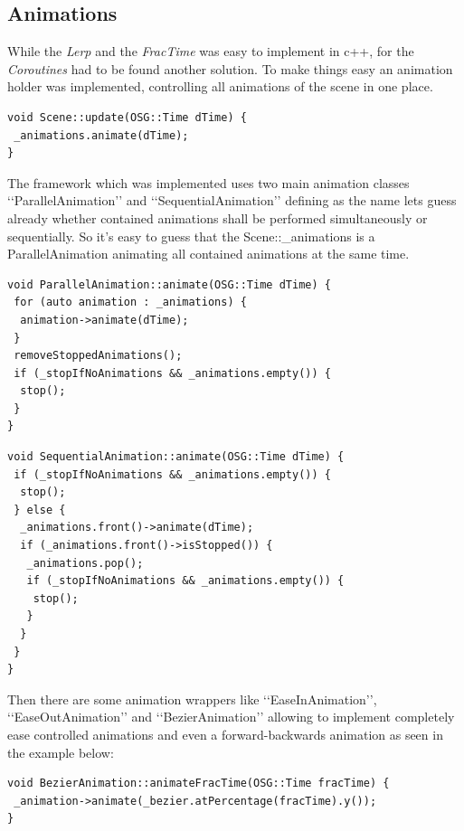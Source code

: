 \subsection{Animations}

While the \emph{Lerp} and the \emph{FracTime} was easy to implement in c++, for the \emph{Coroutines} had to be found another solution. To make things easy an animation holder was implemented, controlling all animations of the scene in one place.

\begin{lstlisting}[breaklines=true]
void Scene::update(OSG::Time dTime) {
 _animations.animate(dTime);
}
\end{lstlisting}

The framework which was implemented uses two main animation classes \lq\lq{}ParallelAnimation\rq\rq{} and \lq\lq{}SequentialAnimation\rq\rq{} defining as the name lets guess already whether contained animations shall be performed simultaneously or sequentially. So it\rq{}s easy to guess that the Scene::\_animations is a ParallelAnimation animating all contained animations at the same time.
\begin{lstlisting}[breaklines=true, caption={ParallelAnimation::animate}]
void ParallelAnimation::animate(OSG::Time dTime) {
 for (auto animation : _animations) {
  animation->animate(dTime);
 }
 removeStoppedAnimations();
 if (_stopIfNoAnimations && _animations.empty()) {
  stop();
 }
}
\end{lstlisting}

\begin{lstlisting}[breaklines=true, caption={SequentialAnimation::animate}]
void SequentialAnimation::animate(OSG::Time dTime) {
 if (_stopIfNoAnimations && _animations.empty()) {
  stop();
 } else {
  _animations.front()->animate(dTime);
  if (_animations.front()->isStopped()) {
   _animations.pop();
   if (_stopIfNoAnimations && _animations.empty()) {
    stop();
   }
  }
 }
}
\end{lstlisting}

Then there are some animation wrappers like \lq\lq{}EaseInAnimation\rq\rq{}, \lq\lq{}EaseOutAnimation\rq\rq{} and \lq\lq{}BezierAnimation\rq\rq{} allowing to implement completely ease controlled animations and even a forward-backwards animation as seen in the example below:
\begin{lstlisting}[breaklines=true, caption={BezierAnimation::animate}]
void BezierAnimation::animateFracTime(OSG::Time fracTime) {
 _animation->animate(_bezier.atPercentage(fracTime).y());
}
\end{lstlisting}

